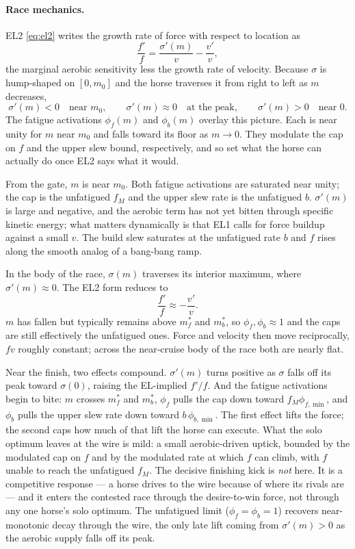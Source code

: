 \documentclass[11pt]{article}
\begin{document}
\paragraph{Race mechanics.} EL2 \eqref{eq:el2} writes the growth rate of force with respect to location as
\[
\frac{f'}{f} = \frac{\sigma'(m)}{v} - \frac{v'}{v},
\]
the marginal aerobic sensitivity less the growth rate of velocity. Because $\sigma$ is hump-shaped on $[0, m_0]$ and the horse traverses it from right to left as $m$ decreases,
\[
\sigma'(m) < 0 \quad \text{near } m_0, \qquad \sigma'(m) \approx 0 \quad \text{at the peak}, \qquad \sigma'(m) > 0 \quad \text{near } 0.
\]
The fatigue activations $\phi_f(m)$ and $\phi_b(m)$ overlay this picture. Each is near unity for $m$ near $m_0$ and falls toward its floor as $m \to 0$. They modulate the cap on $f$ and the upper slew bound, respectively, and so set what the horse can actually do once EL2 says what it would.

From the gate, $m$ is near $m_0$. Both fatigue activations are saturated near unity; the cap is the unfatigued $f_M$ and the upper slew rate is the unfatigued $b$. $\sigma'(m)$ is large and negative, and the aerobic term has not yet bitten through specific kinetic energy; what matters dynamically is that EL1 calls for force buildup against a small $v$. The build slew saturates at the unfatigued rate $b$ and $f$ rises along the smooth analog of a bang-bang ramp.

In the body of the race, $\sigma(m)$ traverses its interior maximum, where $\sigma'(m) \approx 0$. The EL2 form reduces to
\[
\frac{f'}{f} \approx - \frac{v'}{v}.
\]
$m$ has fallen but typically remains above $m_f^*$ and $m_b^*$, so $\phi_f, \phi_b \approx 1$ and the caps are still effectively the unfatigued ones. Force and velocity then move reciprocally, $fv$ roughly constant; across the near-cruise body of the race both are nearly flat.

Near the finish, two effects compound. $\sigma'(m)$ turns positive as $\sigma$ falls off its peak toward $\sigma(0)$, raising the EL-implied $f'/f$. And the fatigue activations begin to bite: $m$ crosses $m_f^*$ and $m_b^*$, $\phi_f$ pulls the cap down toward $f_M \phi_{f,\min}$, and $\phi_b$ pulls the upper slew rate down toward $b\, \phi_{b,\min}$. The first effect lifts the force; the second caps how much of that lift the horse can execute. What the solo optimum leaves at the wire is mild: a small aerobic-driven uptick, bounded by the modulated cap on $f$ and by the modulated rate at which $f$ can climb, with $f$ unable to reach the unfatigued $f_M$. The decisive finishing kick is \emph{not} here. It is a competitive response --- a horse drives to the wire because of where its rivals are --- and it enters the contested race through the desire-to-win force, not through any one horse's solo optimum. The unfatigued limit ($\phi_f = \phi_b = 1$) recovers near-monotonic decay through the wire, the only late lift coming from $\sigma'(m) > 0$ as the aerobic supply falls off its peak.
\end{document}
